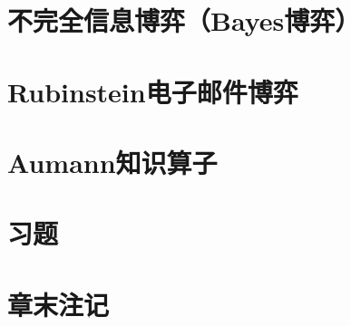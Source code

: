 \section{不完全信息博弈（Bayes博弈）}

\section{Rubinstein电子邮件博弈}


\section{Aumann知识算子}

\section{习题}


\section{章末注记}